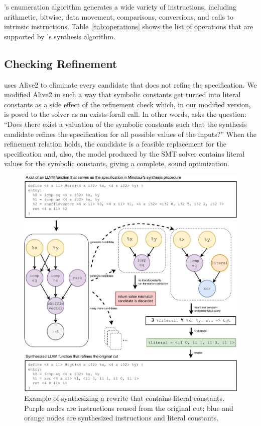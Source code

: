 \minotaur{}'s enumeration algorithm generates a wide variety of instructions,
including arithmetic, bitwise, data movement, comparisons, conversions,
and calls to intrinsic instructions.
%
Table~\ref{tab:operations} shows the list of operations that are
supported by \minotaur{}'s synthesis algorithm.



\subsection{Checking Refinement}

\minotaur{} uses Alive2 to eliminate every candidate that does not refine
the specification.
%
We modified Alive2 in such a way that symbolic constants get turned
into literal constants as a side effect of the refinement check which,
in our modified version, is posed to the solver as an exists-forall
call.
%
In other words, \minotaur{} asks the question: ``Does there exist a
valuation of the symbolic constants such that the synthesis candidate
refines the specification for all possible values of the inputs?''
%
When the refinement relation holds, the candidate is a feasible
replacement for the specification and, also, the model produced by the
SMT solver contains literal values for the symbolic constants, giving
a complete, sound optimization.


\begin {figure}[tbp]
  \centering
  \includegraphics[width=\linewidth]{figures/solve_literal.pdf}
  \caption{Example of synthesizing a rewrite that contains literal
    constants.  Purple nodes are instructions reused from the original
    cut; blue and orange nodes are synthesized instructions and
    literal constants.}
  \label{fig:synthesizing}
\end{figure}

